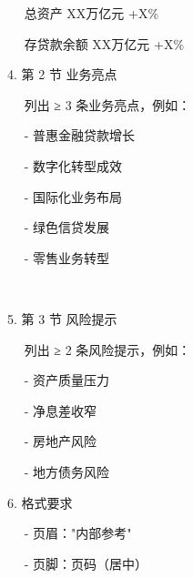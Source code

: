 \documentclass[
  american,
  chinese,
]{ctexart}
\begin{document}
\foreignlanguage{american}{{~~ }\textbar{} }{总资产}\foreignlanguage{american}{ \textbar{} XX}{万亿元}\foreignlanguage{american}{ \textbar{} +X\% \textbar{}}

\foreignlanguage{american}{{~~ }\textbar{} }{存贷款余额}\foreignlanguage{american}{ \textbar{} XX}{万亿元}\foreignlanguage{american}{ \textbar{} +X\% \textbar{}}

\foreignlanguage{american}{4. }{第}\foreignlanguage{american}{ 2 }{节}{ }{业务亮点}\foreignlanguage{american}{}

\foreignlanguage{american}{{~~ }}{列出}{ }{≥}\foreignlanguage{american}{ 3 }{{条业务}}{亮点，例如：}\foreignlanguage{american}{}

\foreignlanguage{american}{{~~ }- }{普惠金融贷款增长}\foreignlanguage{american}{}

\foreignlanguage{american}{{~~ }- }{数字化转型成效}\foreignlanguage{american}{}

\foreignlanguage{american}{{~~ }- }{国际化业务布局}\foreignlanguage{american}{}

\foreignlanguage{american}{{~~ }- }{绿色信贷发展}\foreignlanguage{american}{}

\foreignlanguage{american}{{~~ }- }{零售业务转型}\foreignlanguage{american}{}

\foreignlanguage{american}{}

~

\foreignlanguage{american}{5. }{第}\foreignlanguage{american}{ 3 }{节}{ }{风险提示}\foreignlanguage{american}{}

\foreignlanguage{american}{{~~ }}{列出}{ }{≥}\foreignlanguage{american}{ 2 }{{条风险}}{提示，例如：}\foreignlanguage{american}{}

\foreignlanguage{american}{{~~ }- }{资产质量压力}\foreignlanguage{american}{}

\foreignlanguage{american}{{~~ }- }{净息差收窄}\foreignlanguage{american}{}

\foreignlanguage{american}{{~~ }- }{房地产风险}\foreignlanguage{american}{}

\foreignlanguage{american}{{~~ }- }{地方债务风险}\foreignlanguage{american}{}

\foreignlanguage{american}{6. }{格式要求}\foreignlanguage{american}{}

\foreignlanguage{american}{{~~ }- }{页眉：}\foreignlanguage{american}{"}{内部参考}\foreignlanguage{american}{"}

\foreignlanguage{american}{{~~ }- }{页脚：页码（居中）}\foreignlanguage{american}{}
\end{document}
